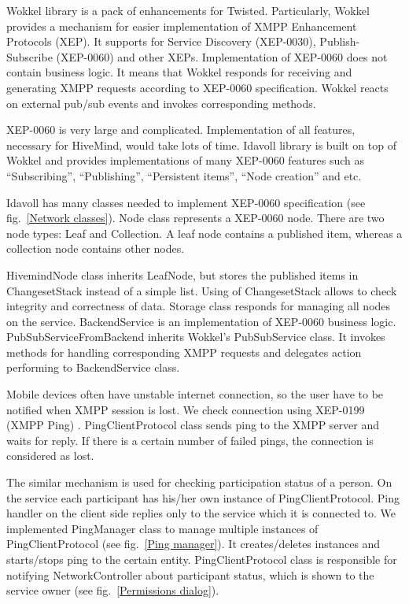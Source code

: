 Wokkel library is a pack of enhancements for Twisted. Particularly, Wokkel
provides a mechanism for easier implementation of XMPP Enhancement Protocols
(XEP). It supports for Service Discovery (XEP-0030), Publish-Subscribe
(XEP-0060) and other XEPs. Implementation of XEP-0060 does not contain business
logic. It means that Wokkel responds for receiving and generating XMPP requests
according to XEP-0060 specification. Wokkel reacts on external pub/sub events
and invokes corresponding methods.

XEP-0060 is very large and complicated. Implementation of all features,
necessary for HiveMind, would take lots of time. Idavoll library is built on top
of Wokkel and provides implementations of many XEP-0060 features such as
``Subscribing'', ``Publishing'', ``Persistent items'', ``Node creation'' and
etc.

Idavoll has many classes needed to implement XEP-0060 specification (see
fig.~\ref{Network classes}). Node class represents a XEP-0060 node. There are
two node types: Leaf and Collection. A leaf node contains a published item,
whereas a collection node contains other nodes.

HivemindNode class inherits LeafNode, but stores the published items in
ChangesetStack instead of a simple list. Using of ChangesetStack allows to check
integrity and correctness of data. Storage class responds for managing all nodes
on the service. BackendService is an implementation of XEP-0060 business logic.
PubSubServiceFromBackend inherits Wokkel's PubSubService class. It invokes
methods for handling corresponding XMPP requests and delegates action performing
to BackendService class.

Mobile devices often have unstable internet connection, so the user have to be
notified when XMPP session is lost. We check connection using XEP-0199 (XMPP
Ping) \cite{ping-xep-0199}. PingClientProtocol class sends ping to the XMPP
server and waits for reply. If there is a certain number of failed pings, the
connection is considered as lost.

The similar mechanism is used for checking participation status of a person. On
the service each participant has his/her own instance of PingClientProtocol. Ping
handler on the client side replies only to the service which it is connected
to. We implemented PingManager class to manage multiple instances of
PingClientProtocol (see fig.~\ref{Ping manager}).  It creates/deletes instances
and starts/stops ping to the certain entity. PingClientProtocol class is
responsible for notifying NetworkController about participant status, which is
shown to the service owner (see fig.~\ref{Permissions dialog}).


